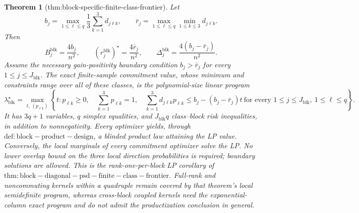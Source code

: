 \documentclass{article}
\newtheorem{theorem}{Theorem}
\begin{document}
\begin{theorem}[thm:block-specific-finite-class-frontier]
Let
\[
b_j=\max_{1\le\ell\le q}\frac13\sum_{k=1}^3d_{j\ell k},
\qquad
\bar r_j=\max_{1\le\ell\le q}\min_{1\le k\le3}d_{j\ell k}.
\]
Then
\[
B_j^{\mathrm{blk}}=\frac{4b_j}{n^2},
\qquad
(r_j^{\mathrm{blk}})^\star=\frac{4\bar r_j}{n^2},
\qquad
\Delta_j^{\mathrm{blk}}=\frac{4(b_j-\bar r_j)}{n^2}.
\]
Assume the necessary gain-positivity boundary condition \(b_j>\bar r_j\) for every \(1\le j\le J_{\mathrm{blk}}\). The exact finite-sample commitment value, whose minimum and constraints range over all of these classes, is the polynomial-size linear program
\[
\boxed{
\lambda_{\mathrm{blk}}^\star
=\max_{t,\,(p_{\ell k})}
\left\{t:
p_{\ell k}\ge0,\quad
\sum_{k=1}^3p_{\ell k}=1,\quad
\sum_{k=1}^3d_{j\ell k}p_{\ell k}
\le b_j-(b_j-\bar r_j)t
\ \text{for every }1\le j\le J_{\mathrm{blk}},\ 1\le\ell\le q
\right\}.}
\]
It has \(3q+1\) variables, \(q\) simplex equalities, and \(J_{\mathrm{blk}}q\) class--block risk inequalities, in addition to nonnegativity. Every optimizer yields, through \(\mathrm{def:block-product-design}\), a blinded product law attaining the LP value. Conversely, the local marginals of every commitment optimizer solve the LP. No lower overlap bound on the three local direction probabilities is required; boundary solutions are allowed. This is the rank-one-per-block LP corollary of \(\mathrm{thm:block-diagonal-psd-finite-class-frontier}\). Full-rank and noncommuting kernels within a quadruple remain covered by that theorem's local semidefinite program, whereas cross-block coupled kernels need the exponential-column exact program and do not admit the productization conclusion in general.
\end{theorem}
\end{document}
